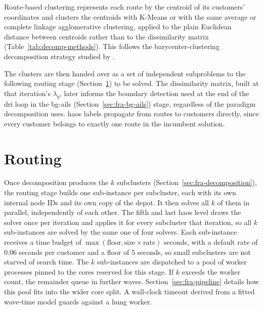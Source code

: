 Route-based clustering represents each route by the centroid of its customers' coordinates and clusters the centroids with K-Means or with the same average or complete linkage agglomerative clustering, applied to the plain Euclidean distance between centroids rather than to the dissimilarity matrix (Table~\ref{tab:decomp-methods}). This follows the barycenter-clustering decomposition strategy studied by \citet{santiniDecompositionStrategiesVehicle2023}.

The clusters are then handed over as a set of independent subproblems to the following routing stage (Section~\ref{sec:fra-routing}) to be solved. The dissimilarity matrix, built at that iteration's $\lambda_q$, later informs the boundary detection used at the end of the \gls{dri} loop in the \gls{bg-ails} (Section~\ref{sec:fra-bg-ails}) stage, regardless of the paradigm decomposition uses. \gls{haos} labels propagate from routes to customers directly, since every customer belongs to exactly one route in the incumbent solution.

\section{Routing}\label{sec:fra-routing}
Once decomposition produces the $k$ subclusters (Section~\ref{sec:fra-decomposition}), the routing stage builds one sub-instance per subcluster, each with its own internal node IDs and its own copy of the depot. It then solves all $k$ of them in parallel, independently of each other. The fifth and last \gls{haos} level draws the solver once per iteration and applies it for every subcluster that iteration, so all $k$ sub-instances are solved by the same one of four solvers. Each sub-instance receives a time budget of $\max(\text{floor}, \text{size} \times \text{rate})$ seconds, with a default rate of 0.06 seconds per customer and a floor of 5 seconds, so small subclusters are not starved of search time. The $k$ sub-instances are dispatched to a pool of worker processes pinned to the cores reserved for this stage. If $k$ exceeds the worker count, the remainder queue in further waves. Section~\ref{sec:fra-pipeline} details how this pool fits into the wider core split. A wall-clock timeout derived from a fitted wave-time model guards against a hung worker.

